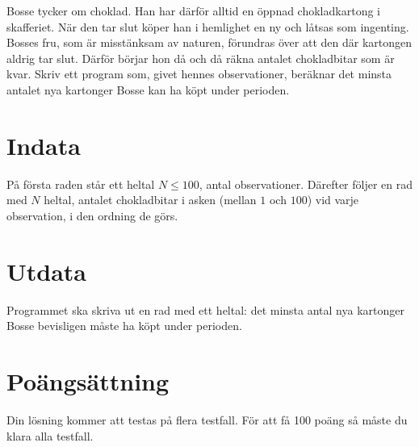 Bosse tycker om choklad.
Han har därför alltid en öppnad chokladkartong i skafferiet.
När den tar slut köper han i hemlighet en ny och låtsas som ingenting.
Bosses fru, som är misstänksam av naturen, förundras över att den där kartongen aldrig tar slut.
Därför börjar hon då och då räkna antalet chokladbitar som är kvar.
Skriv ett program som, givet hennes observationer, beräknar det minsta antalet nya kartonger Bosse kan ha köpt under perioden.

\section*{Indata}
På första raden står ett heltal $N \le 100$, antal observationer.
Därefter följer en rad med $N$ heltal, antalet chokladbitar i asken (mellan $1$ och $100$) vid varje observation, i den ordning de görs.

\section*{Utdata}
Programmet ska skriva ut en rad med ett heltal: det minsta antal nya kartonger Bosse bevisligen måste ha köpt under perioden.

\section*{Poängsättning}
Din lösning kommer att testas på flera testfall. För att få 100 poäng så måste du klara alla testfall.
